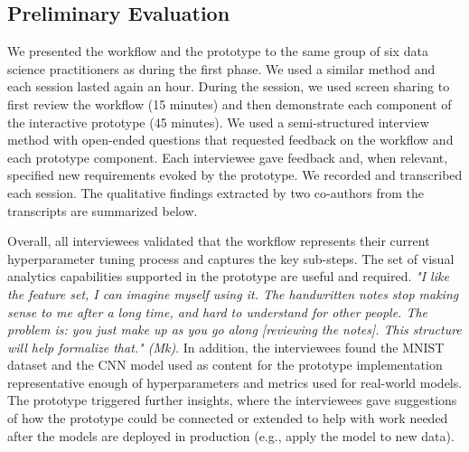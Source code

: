 \documentclass[preprint]{vgtc}        %
\begin{document}
\subsection{Preliminary Evaluation}
We presented the workflow and the prototype to the same group of six data science practitioners as during the first phase. We used a similar method and each session lasted again an hour. During the session, we used screen sharing to first review the workflow (15 minutes) and then demonstrate each component of the interactive prototype (45 minutes). We used a semi-structured interview method with open-ended questions that requested feedback on the workflow and each prototype component. Each interviewee gave feedback and, when relevant, specified new requirements evoked by the prototype. We recorded and transcribed each session. The qualitative findings extracted by two co-authors from the transcripts are summarized below.

Overall, all interviewees validated that the workflow represents their current hyperparameter tuning process and captures the key sub-steps. The set of visual analytics capabilities supported in the prototype are useful and required. \textit{"I like the feature set, I can imagine myself using it. The handwritten notes stop making sense to me after a long time, and hard to understand for other people. The problem is: you just make up as you go along [reviewing the notes]. This structure will help formalize that." (Mk)}. In addition, the interviewees found the MNIST dataset and the CNN model used as content for the prototype implementation representative enough of hyperparameters and metrics used for real-world models. The prototype triggered further insights, where the interviewees gave suggestions of how the prototype could be connected or extended to help with work needed after the models are deployed in production (e.g., apply the model to new data). 
\end{document}
